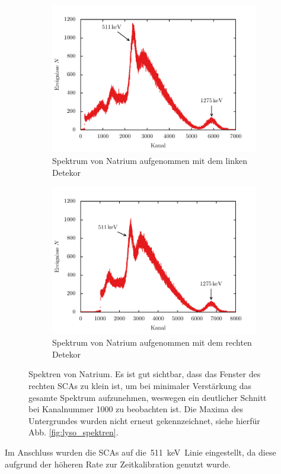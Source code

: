 \documentclass[11pt, a4paper]{article}
\numberwithin{equation}{section}
\begin{document}
\begin{figure}[htbp]
	\begin{subfigure}{\textwidth}
		\centering
		\includegraphics[width=\textwidth]{./figures/na_links}
		\caption{Spektrum von Natrium aufgenommen mit dem linken Detekor}
	\end{subfigure}
	\begin{subfigure}{\textwidth}
		\centering
		\includegraphics[width=\textwidth]{./figures/na_rechts}
		\caption{Spektrum von Natrium aufgenommen mit dem rechten Detekor}
	\end{subfigure}
	\caption{Spektren von Natrium. Es ist gut sichtbar, dass das Fenster des rechten SCAs zu klein ist, um bei minimaler Verstärkung das gesamte Spektrum aufzunehmen, weswegen ein deutlicher Schnitt bei Kanalnummer \num{1000} zu beobachten ist. Die Maxima des Untergrundes wurden nicht erneut gekennzeichnet, siehe hierfür Abb. \ref{fig:lyso_spektren}.}
	\label{fig:na_spektren}
\end{figure}
Im Anschluss wurden die SCAs auf die~\SI{511}{keV}~Linie eingestellt, da diese aufgrund der höheren Rate zur Zeitkalibration genutzt wurde.
\end{document}
